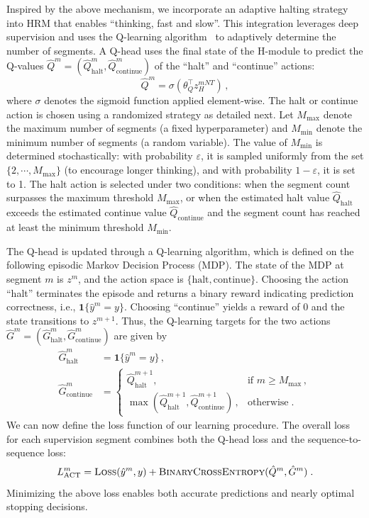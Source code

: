 Inspired by the above mechanism, we incorporate an adaptive halting strategy into HRM that enables ``thinking, fast and slow''. This integration leverages deep supervision and uses the Q-learning algorithm~\cite{Sutton-Barto-2018} to adaptively determine the number of segments. A Q-head uses the final state of the H-module to predict the Q-values $\hat{Q}^m = (\hat{Q}^m_\text{halt}, \hat{Q}^m_\text{continue})$ of the ``halt'' and ``continue'' actions:
\begin{equation*}
    \hat{Q}^m = \sigma(\theta_Q^\top z_H^{mNT})\,,
\end{equation*}
where $\sigma$ denotes the sigmoid function applied element-wise. The halt or continue action is chosen using a randomized strategy as detailed next. Let $M_{\max}$ denote the maximum number of segments (a fixed hyperparameter) and $M_{\min}$ denote the minimum number of segments (a random variable). The value of $M_{\min}$ is determined stochastically: with probability $\varepsilon$, it is sampled uniformly from the set $\{2,\cdots,M_{\max}\}$ (to encourage longer thinking), and with probability $1-\varepsilon$, it is set to 1. The halt action is selected under two conditions: when the segment count surpasses the maximum threshold $M_{\max}$, or when the estimated halt value $\hat{Q}_\text{halt}$ exceeds the estimated continue value $\hat{Q}_\text{continue}$ and the segment count has reached at least the minimum threshold $M_{\min}$.

The Q-head is updated through a Q-learning algorithm, which is defined on the following episodic Markov Decision Process (MDP). The state of the MDP at segment $m$ is $z^m$, and the action space is $\{\text{halt}, \text{continue}\}$. Choosing the action ``halt'' terminates the episode and returns a binary reward indicating prediction correctness, i.e., $\mathbf{1}\{\hat{y}^m = y\}$. Choosing ``continue'' yields a reward of 0 and the state transitions to $z^{m+1}$. Thus, the Q-learning targets for the two actions $\hat{G}^m = (\hat{G}^m_\text{halt}, \hat{G}^m_\text{continue})$ are given by
\begin{align*}
\hat{G}_\text{halt}^m &= \mathbf{1}\{\hat{y}^m = y\}\,, \\
\hat{G}_\text{continue}^m &= 
\begin{cases}
\hat{Q}_\text{halt}^{m+1}, & \text{if $m \geq M_{\max}$}\,,\\[6pt]
\max(\hat{Q}_\text{halt}^{m+1}, \hat{Q}_\text{continue}^{m+1})\,, & \text{otherwise}\;.
\end{cases}
\end{align*}
We can now define the loss function of our learning procedure. The overall loss for each supervision segment combines both the Q-head loss and the sequence-to-sequence loss:
\begin{equation*}
    L^m_\text{ACT} = \textsc{Loss}(\hat{y}^m, y) + \textsc{BinaryCrossEntropy}(\hat{Q}^m, \hat{G}^m) \;.
\end{equation*}
Minimizing the above loss enables both accurate predictions and nearly optimal stopping decisions. 


